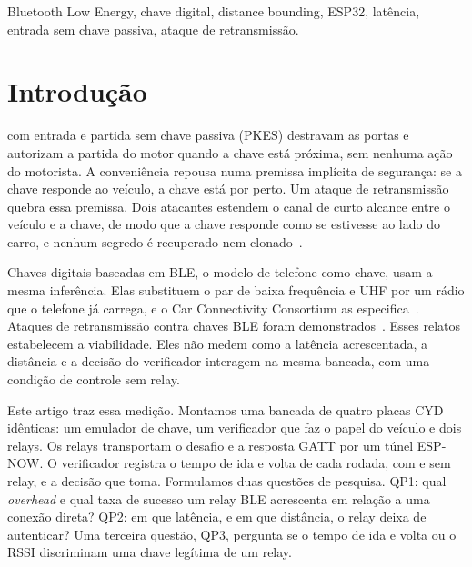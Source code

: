 \documentclass{ieeeaccess}
\begin{document}
\begin{keywords}
Bluetooth Low Energy, chave digital, distance bounding, ESP32, latência, entrada sem chave passiva, ataque de retransmissão.
\end{keywords}

\titlepgskip=-15pt

\maketitle

\section{Introdução}
\label{sec:introduction}

 com entrada e partida sem chave passiva (PKES) destravam as portas e autorizam a partida do motor quando a chave está próxima, sem nenhuma ação do motorista. A conveniência repousa numa premissa implícita de segurança: se a chave responde ao veículo, a chave está por perto. Um ataque de retransmissão quebra essa premissa. Dois atacantes estendem o canal de curto alcance entre o veículo e a chave, de modo que a chave responde como se estivesse ao lado do carro, e nenhum segredo é recuperado nem clonado~\cite{b1}.

Chaves digitais baseadas em BLE, o modelo de telefone como chave, usam a mesma inferência. Elas substituem o par de baixa frequência e UHF por um rádio que o telefone já carrega, e o Car Connectivity Consortium as especifica~\cite{b9}. Ataques de retransmissão contra chaves BLE foram demonstrados~\cite{b3,b4}. Esses relatos estabelecem a viabilidade. Eles não medem como a latência acrescentada, a distância e a decisão do verificador interagem na mesma bancada, com uma condição de controle sem relay.

Este artigo traz essa medição. Montamos uma bancada de quatro placas CYD idênticas: um emulador de chave, um verificador que faz o papel do veículo e dois relays. Os relays transportam o desafio e a resposta GATT por um túnel ESP-NOW. O verificador registra o tempo de ida e volta de cada rodada, com e sem relay, e a decisão que toma. Formulamos duas questões de pesquisa. QP1: qual \emph{overhead} e qual taxa de sucesso um relay BLE acrescenta em relação a uma conexão direta? QP2: em que latência, e em que distância, o relay deixa de autenticar? Uma terceira questão, QP3, pergunta se o tempo de ida e volta ou o RSSI discriminam uma chave legítima de um relay.
\end{document}
